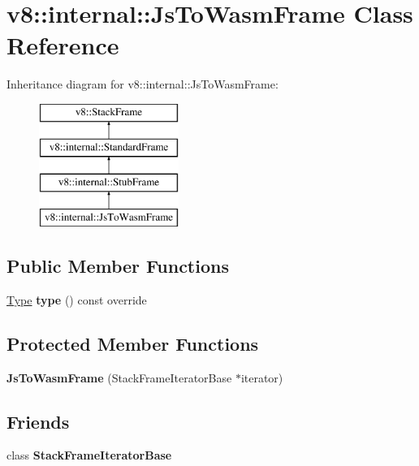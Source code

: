 \hypertarget{classv8_1_1internal_1_1_js_to_wasm_frame}{}\section{v8\+:\+:internal\+:\+:Js\+To\+Wasm\+Frame Class Reference}
\label{classv8_1_1internal_1_1_js_to_wasm_frame}
Inheritance diagram for v8\+:\+:internal\+:\+:Js\+To\+Wasm\+Frame\+:\begin{figure}[H]
\begin{center}
\leavevmode
\includegraphics[height=4.000000cm]{classv8_1_1internal_1_1_js_to_wasm_frame}
\end{center}
\end{figure}
\subsection*{Public Member Functions}
\begin{DoxyCompactItemize}
\item 
\hyperlink{classv8_1_1internal_1_1_type}{Type} {\bfseries type} () const  override\hypertarget{classv8_1_1internal_1_1_js_to_wasm_frame_a178f206cefb95bb4244fd273b7863bcc}{}\label{classv8_1_1internal_1_1_js_to_wasm_frame_a178f206cefb95bb4244fd273b7863bcc}

\end{DoxyCompactItemize}
\subsection*{Protected Member Functions}
\begin{DoxyCompactItemize}
\item 
{\bfseries Js\+To\+Wasm\+Frame} (Stack\+Frame\+Iterator\+Base $\ast$iterator)\hypertarget{classv8_1_1internal_1_1_js_to_wasm_frame_a9a47ff06e9a11931cf7bb16cdb3e119f}{}\label{classv8_1_1internal_1_1_js_to_wasm_frame_a9a47ff06e9a11931cf7bb16cdb3e119f}

\end{DoxyCompactItemize}
\subsection*{Friends}
\begin{DoxyCompactItemize}
\item 
class {\bfseries Stack\+Frame\+Iterator\+Base}\hypertarget{classv8_1_1internal_1_1_js_to_wasm_frame_ac7310421866976ca454bbe11c5f926c3}{}\label{classv8_1_1internal_1_1_js_to_wasm_frame_ac7310421866976ca454bbe11c5f926c3}

\end{DoxyCompactItemize}
